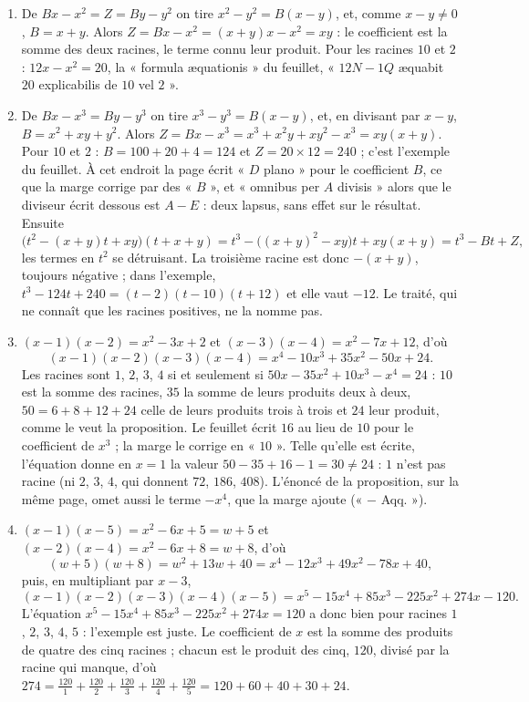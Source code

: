 \documentclass[11pt,a4paper]{article}
\begin{document}
\begin{solution}
\begin{enumerate}
\item De $Bx - x^2 = Z = By - y^2$ on tire $x^2 - y^2 = B(x - y)$, et, comme
  $x - y \neq 0$, $B = x + y$. Alors $Z = Bx - x^2 = (x + y)x - x^2 = xy$ : le
  coefficient est la somme des deux racines, le terme connu leur produit. Pour les
  racines $10$ et $2$ : $12x - x^2 = 20$, la « formula æquationis » du feuillet, « $12N - 1Q$
  æquabit $20$ explicabilis de $10$ vel $2$ ».
\item De $Bx - x^3 = By - y^3$ on tire $x^3 - y^3 = B(x - y)$, et, en divisant par
  $x - y$, $B = x^2 + xy + y^2$. Alors
  $Z = Bx - x^3 = x^3 + x^2y + xy^2 - x^3 = xy(x + y)$. Pour $10$ et $2$ :
  $B = 100 + 20 + 4 = 124$ et $Z = 20 \times 12 = 240$ ; c'est l'exemple du feuillet.
  À cet endroit la page écrit « $D$ plano » pour le coefficient $B$, ce que la
  marge corrige par des « $B$ », et « omnibus per $A$ divisis » alors que le
  diviseur écrit dessous est $A - E$ : deux lapsus, sans effet sur le résultat.
  Ensuite
  \[
  \bigl(t^2 - (x+y)t + xy\bigr)(t + x + y)
  = t^3 - \bigl((x+y)^2 - xy\bigr)t + xy(x+y) = t^3 - Bt + Z ,
  \]
  les termes en $t^2$ se détruisant. La troisième racine est donc $-(x + y)$,
  toujours négative ; dans l'exemple,
  $t^3 - 124t + 240 = (t - 2)(t - 10)(t + 12)$ et elle vaut $-12$. Le traité, qui
  ne connaît que les racines positives, ne la nomme pas.
\item $(x-1)(x-2) = x^2 - 3x + 2$ et $(x-3)(x-4) = x^2 - 7x + 12$, d'où
  \[
  (x-1)(x-2)(x-3)(x-4) = x^4 - 10x^3 + 35x^2 - 50x + 24 .
  \]
  Les racines sont $1$, $2$, $3$, $4$ si et seulement si
  $50x - 35x^2 + 10x^3 - x^4 = 24$ : $10$ est la somme des racines, $35$ la somme de
  leurs produits deux à deux, $50 = 6 + 8 + 12 + 24$ celle de leurs produits trois à
  trois et $24$ leur produit, comme le veut la proposition. Le feuillet écrit $16$
  au lieu de $10$ pour le coefficient de $x^3$ ; la marge le corrige en « $10$ ».
  Telle qu'elle est écrite, l'équation donne en $x = 1$ la valeur
  $50 - 35 + 16 - 1 = 30 \neq 24$ : $1$ n'est pas racine (ni $2$, $3$, $4$, qui
  donnent $72$, $186$, $408$). L'énoncé de la proposition, sur la même page, omet
  aussi le terme $-x^4$, que la marge ajoute (« $-$ Aqq. »).
\item $(x-1)(x-5) = x^2 - 6x + 5 = w + 5$ et $(x-2)(x-4) = x^2 - 6x + 8 = w + 8$,
  d'où
  \[
  (w+5)(w+8) = w^2 + 13w + 40 = x^4 - 12x^3 + 49x^2 - 78x + 40 ,
  \]
  puis, en multipliant par $x - 3$,
  \[
  (x-1)(x-2)(x-3)(x-4)(x-5) = x^5 - 15x^4 + 85x^3 - 225x^2 + 274x - 120 .
  \]
  L'équation $x^5 - 15x^4 + 85x^3 - 225x^2 + 274x = 120$ a donc bien pour racines
  $1$, $2$, $3$, $4$, $5$ : l'exemple est juste. Le coefficient de $x$ est la somme
  des produits de quatre des cinq racines ; chacun est le produit des cinq,
  $120$, divisé par la racine qui manque, d'où
  $274 = \frac{120}{1} + \frac{120}{2} + \frac{120}{3} + \frac{120}{4} + \frac{120}{5}
  = 120 + 60 + 40 + 30 + 24$.
\end{enumerate}


\end{solution}
\end{document}
